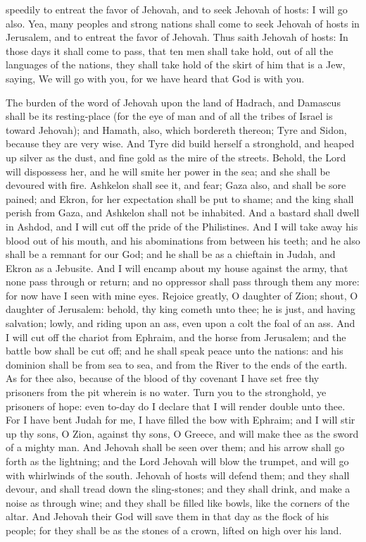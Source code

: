 speedily to entreat the favor of Jehovah, and to seek Jehovah of hosts: I will go also. Yea, many peoples and strong nations shall come to seek Jehovah of hosts in Jerusalem, and to entreat the favor of Jehovah. Thus saith Jehovah of hosts: In those days it shall come to pass, that ten men shall take hold, out of all the languages of the nations, they shall take hold of the skirt of him that is a Jew, saying, We will go with you, for we have heard that God is with you. 

The burden of the word of Jehovah upon the land of Hadrach, and Damascus shall be its resting-place (for the eye of man and of all the tribes of Israel is toward Jehovah); and Hamath, also, which bordereth thereon; Tyre and Sidon, because they are very wise. And Tyre did build herself a stronghold, and heaped up silver as the dust, and fine gold as the mire of the streets. Behold, the Lord will dispossess her, and he will smite her power in the sea; and she shall be devoured with fire. Ashkelon shall see it, and fear; Gaza also, and shall be sore pained; and Ekron, for her expectation shall be put to shame; and the king shall perish from Gaza, and Ashkelon shall not be inhabited. And a bastard shall dwell in Ashdod, and I will cut off the pride of the Philistines. And I will take away his blood out of his mouth, and his abominations from between his teeth; and he also shall be a remnant for our God; and he shall be as a chieftain in Judah, and Ekron as a Jebusite.  And I will encamp about my house against the army, that none pass through or return; and no oppressor shall pass through them any more: for now have I seen with mine eyes.  Rejoice greatly, O daughter of Zion; shout, O daughter of Jerusalem: behold, thy king cometh unto thee; he is just, and having salvation; lowly, and riding upon an ass, even upon a colt the foal of an ass. And I will cut off the chariot from Ephraim, and the horse from Jerusalem; and the battle bow shall be cut off; and he shall speak peace unto the nations: and his dominion shall be from sea to sea, and from the River to the ends of the earth.  As for thee also, because of the blood of thy covenant I have set free thy prisoners from the pit wherein is no water. Turn you to the stronghold, ye prisoners of hope: even to-day do I declare that I will render double unto thee. For I have bent Judah for me, I have filled the bow with Ephraim; and I will stir up thy sons, O Zion, against thy sons, O Greece, and will make thee as the sword of a mighty man. And Jehovah shall be seen over them; and his arrow shall go forth as the lightning; and the Lord Jehovah will blow the trumpet, and will go with whirlwinds of the south. Jehovah of hosts will defend them; and they shall devour, and shall tread down the sling-stones; and they shall drink, and make a noise as through wine; and they shall be filled like bowls, like the corners of the altar. And Jehovah their God will save them in that day as the flock of his people; for they shall be as the stones of a crown, lifted on high over his land. 